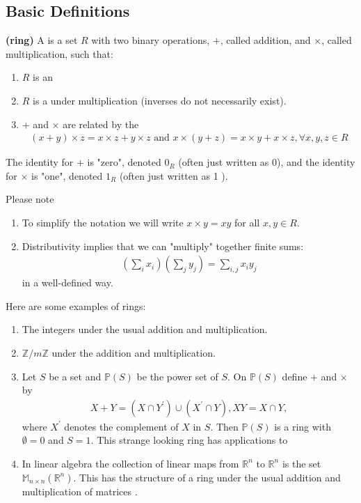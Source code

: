 \documentclass{article}
\newcommand{\bfs}[1]{\textbf{({#1}) }}
\begin{document}
\subsection{Basic Definitions}
\begin{defa}\bfs{ring}
 A  is a set $R$ with two binary operations, $+$, called addition, and $\times$, called multiplication, such that:
 \begin{enumerate}
     \item $R$ is an 
     \item $R$ is a  under multiplication (inverses do not necessarily exist).
     \item $+$ and $\times$ are related by the 
\begin{align*}
(x+y) \times z=x \times z+y \times z \text { and } x \times(y+z)=x \times y+x \times z, \forall x, y, z \in R
\end{align*}
 \end{enumerate}
 The identity for $+$ is "zero", denoted $0_{R}$ (often just written as 0), and the identity for $\times$ is "one", denoted $1_{R}$ (often just written as 1 ).
\end{defa} 
\begin{rema}Please note
\begin{enumerate}
    \item To simplify the notation we will write $x \times y=x y$ for all $x, y \in R$.
    \item Distributivity implies that we can "multiply" together finite sums:
\begin{align*}
\left(\sum_i x_{i}\right)\left(\sum_j y_{j}\right)=\sum_{i,j} x_{i} y_{j}
\end{align*}
in a well-defined way.
\end{enumerate}
\end{rema}
\begin{exma}
Here are some examples of rings:
\begin{enumerate}
    \item The integers under the usual addition and multiplication.
    \item  $\mathbb{Z} / m \mathbb{Z}$ under the addition and multiplication.
    \item Let $S$ be a set and $\mathbb{P}(S)$ be the power set of $S$. On $\mathbb{P}(S)$ define $+$ and $\times$ by
\begin{align*}
X+Y=\left(X \cap Y^{\prime}\right) \cup\left(X^{\prime} \cap Y\right), X Y=X \cap Y,
\end{align*}
where $X^{\prime}$ denotes the complement of $X$ in $S$. Then $\mathbb{P}(S)$ is a ring with $\emptyset=0$ and $S=1$. This strange looking ring has applications to 
\item In linear algebra the collection of linear maps from $\mathbb{R}^{n}$ to $\mathbb{R}^{n}$ is the set $\mathbb{M}_{n \times n}\left(\mathbb{R}^{n}\right)$. This has the structure of a ring under the usual addition and multiplication of matrices .
\end{enumerate}
\end{exma}
\end{document}

